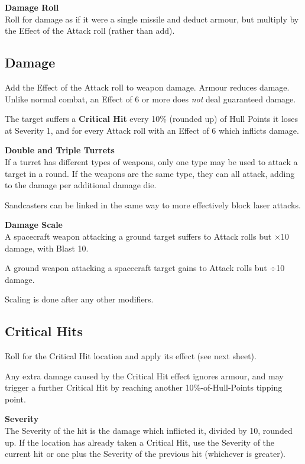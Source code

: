 \documentclass{cheatsheet}
\begin{document}
\begin{multicols}{3}
\textbf{Damage Roll}\\
Roll for damage as if it were a single missile and deduct armour, but
multiply by the Effect of the Attack roll (rather than add).

\subsection{Damage}

Add the Effect of the Attack roll to weapon damage.  Armour reduces
damage.  Unlike normal combat, an Effect of 6 or more does \emph{not}
deal guaranteed damage.

The target suffers a \textbf{Critical Hit} every 10\% (rounded up) of
Hull Points it loses at Severity 1, and for every Attack roll with an
Effect of 6 which inflicts damage.

\textbf{Double and Triple Turrets}\\
If a turret has different types of weapons, only one type may be used
to attack a target in a round.  If the weapons are the same type, they
can all attack, adding  to the damage per additional damage
die.

Sandcasters can be linked in the same way to more effectively block
laser attacks.

\textbf{Damage Scale}\\
A spacecraft weapon attacking a ground target suffers  to
Attack rolls but $\times$10 damage, with Blast 10.

A ground weapon attacking a spacecraft target gains  to
Attack rolls but $\div$10 damage.

Scaling is done after any other modifiers.

\subsection{Critical Hits}

Roll for the Critical Hit location and apply its effect (see next
sheet).

Any extra damage caused by the Critical Hit effect ignores armour, and
may trigger a further Critical Hit by reaching another
10\%-of-Hull-Points tipping point.

\textbf{Severity}\\
The Severity of the hit is the damage which inflicted it, divided by
10, rounded up.  If the location has already taken a Critical Hit, use
the Severity of the current hit or one plus the Severity of the
previous hit (whichever is greater).


\end{multicols}
\end{document}
